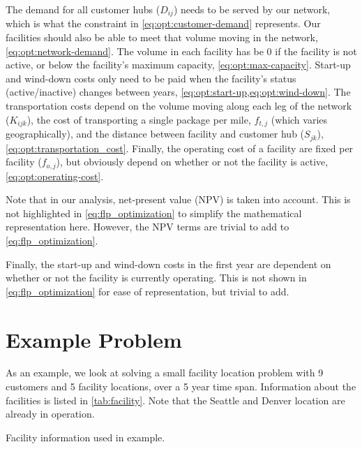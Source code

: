 \documentclass[hidelinks,twoside,10pt,letterpaper]{../note}
\begin{document}
The demand for all customer hubs ($D_{ij}$) needs to be served by our network, which is what the constraint in \cref{eq:opt:customer-demand} represents.
Our facilities should also be able to meet that volume moving in the network, \cref{eq:opt:network-demand}.
The volume in each facility has be 0 if the facility is not active, or below the facility's maximum capacity, \cref{eq:opt:max-capacity}.
Start-up and wind-down costs only need to be paid when the facility's status (active/inactive) changes between years, \cref{eq:opt:start-up,eq:opt:wind-down}.
The transportation costs depend on the volume moving along each leg of the network ($K_{ijk}$), the cost of transporting a single package per mile, $f_{t,j}$ (which varies geographically), and the distance between facility and customer hub ($S_{jk}$), \cref{eq:opt:transportation_cost}.
Finally, the operating cost of a facility are fixed per facility ($f_{o,j}$), but obviously depend on whether or not the facility is active, \cref{eq:opt:operating-cost}.


Note that in our analysis, net-present value (NPV) is taken into account.
This is not highlighted in \cref{eq:flp_optimization} to simplify the mathematical representation here.
However, the NPV terms are trivial to add to \cref{eq:flp_optimization}.

Finally, the start-up and wind-down costs in the first year are dependent on whether or not the facility is currently operating.
This is not shown in \cref{eq:flp_optimization} for ease of representation, but trivial to add.

\section{Example Problem}

As an example, we look at solving a small facility location problem with 9 customers and 5 facility locations, over a 5 year time span.
Information about the facilities  is listed in \cref{tab:facility}.
Note that the Seattle and Denver location are already in operation.

\begin{table}[h]
\caption{Facility information used in example.}\label{tab:facility}
\end{table}
\end{document}
